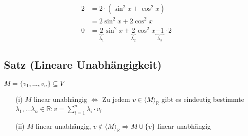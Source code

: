 \documentclass[a4paper, 12pt,titlepage, pdf, headsepline]{article}
\newcommand{\R}{\mathds{R}}
\newcommand{\vecspace}[2]{\langle#1\rangle_{#2}}
\newcommand{\vecspaceR}[1]{\vecspace{#1}{\R}}
\renewcommand{\>}{\rightarrow}
\renewcommand{\*}{\cdot}
\begin{document}
\begin{itemize}
\begin{itemize}
	      	      \begin{align*}
	      	      	2 & =2\*(\sin^2x+\cos^2x)                                                                              \\
	      	      	  & =2\sin^2x+2\cos^2x                                                                                 \\
	      	      	0 & =\underbrace{2}_{\lambda_1}\sin^2x+\underbrace{2}_{\lambda_2}\cos^2x\underbrace{-1}_{\lambda_3}\*2 
	      	      \end{align*}
	      \end{itemize}
\end{itemize}
\subsection{Satz (Lineare Unabhängigkeit)}
\label{1.16}
$M = \{v_1,...,v_n \} \subseteq V$\\
\begin{itemize}
	\item[(i)] $M$ linear unabhängig $\Leftrightarrow  \text{ Zu jedem } v \in \vecspaceR{M}$ gibt es eindeutig bestimmte \\
	      \noindent\hspace*{43mm}$\lambda_1, ... \lambda_n  \in \R:v = \sum_{i= 1}^{n} \lambda_i \cdot v_i$
	\item[(ii)] $M$ linear unabhängig, $v \notin \vecspaceR{M} \Rightarrow M \cup \{ v \} $ linear unabhängig 
\end{itemize}
\end{document}
